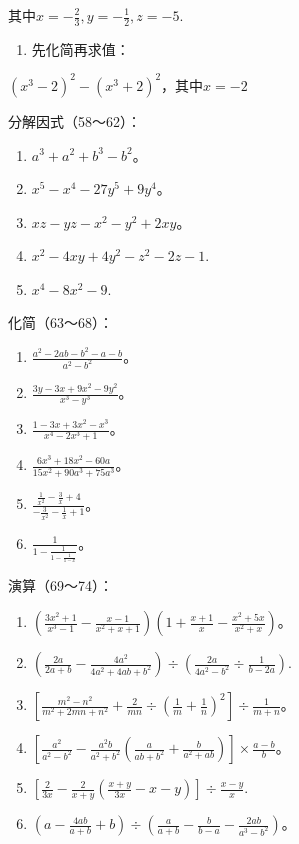 其中\(x = -\frac{2}{3}, y = -\frac{1}{2}, z = -5.\)

\begin{enumerate}[start=57]
\item
  先化简再求值：
\end{enumerate}

\((x^{3} - 2)^{2} - (x^{3} + 2)^{2}\)，其中\(x = -2\)

分解因式（58～62）：

\begin{enumerate}[start=58]
\item
  \(a^3 + a^2 + b^3 - b^2\)。
\item
  \(x^{5} - x^{4} - 27y^{5} + 9y^{4}\)。
\item
  \(xz - yz - x^2 - y^2 + 2xy\)。
\item
  \(x^{2} - 4xy + 4y^{2} - z^{2} - 2z - 1.\)
\item
  \(x^{4} - 8x^{2} - 9.\)
\end{enumerate}

化简（63～68）：

\begin{enumerate}[start=63]
\item
  \(\frac{a^2 - 2ab - b^2 - a - b}{a^2 - b^2}\)。
\item
  \(\frac{3y - 3x + 9x^2 - 9y^2}{x^3 - y^3}\)。
\item
  \(\frac{1 - 3x + 3x^2 - x^3}{x^4 - 2x^3 + 1}\)。
\item
  \(\frac{6x^3 + 18x^2 - 60a}{15x^2 + 90a^3 + 75a^3}\)。
\item
  \(\frac{\frac{1}{x^2} - \frac{3}{x} + 4}{-\frac{3}{x^2} - \frac{1}{x} + 1}\)。
\item
  \(\frac{1}{1 - \frac{1}{1 - \frac{1}{1 - x}}}\)。
\end{enumerate}

演算（69～74）：

\begin{enumerate}[start=69]
\item
  \(\left(\frac{3x^2 + 1}{x^3 - 1} - \frac{x - 1}{x^2 + x + 1}\right)\left(1 + \frac{x + 1}{x} - \frac{x^2 + 5x}{x^2 + x}\right)\)。
\item
  \(\left(\frac{2a}{2a + b} -\frac{4a^2}{4a^2 + 4ab + b^2}\right)\div \left(\frac{2a}{4a^2 - b^2}\div \frac{1}{b - 2a}\right).\)
\item
  \(\left[\frac{m^2 - n^2}{m^2 + 2mn + n^2} + \frac{2}{mn} \div \left(\frac{1}{m} + \frac{1}{n}\right)^2\right] \div \frac{1}{m + n}\)。
\item
  \(\left[\frac{a^2}{a^2 - b^2} - \frac{a^2b}{a^2 + b^2}\left(\frac{a}{ab + b^2} + \frac{b}{a^2 + ab}\right)\right] \times \frac{a - b}{b}\)。
\item
  \(\left[\frac{2}{3x} -\frac{2}{x + y}\left(\frac{x + y}{3x} -x - y\right)\right]\div \frac{x - y}{x}.\)
\item
  \(\left(a - \frac{4ab}{a + b} + b\right) \div \left(\frac{a}{a + b} - \frac{b}{b - a} - \frac{2ab}{a^3 - b^2}\right)\)。
\end{enumerate}

